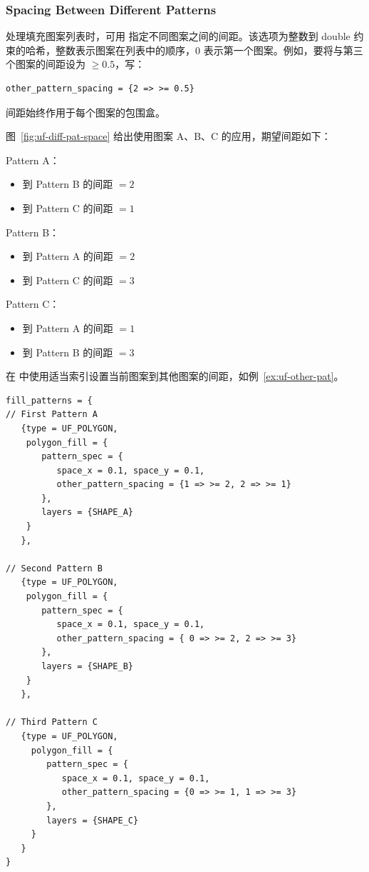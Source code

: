 \subsubsection*{Spacing Between Different Patterns}

处理填充图案列表时，可用  指定不同图案之间的间距。该选项为整数到 double 约束的哈希，整数表示图案在列表中的顺序，0 表示第一个图案。例如，要将与第三个图案的间距设为 $\geq 0.5$，写：
\begin{lstlisting}[style=pxl]
other_pattern_spacing = {2 => >= 0.5}
\end{lstlisting}

\begin{noteBox}
间距始终作用于每个图案的包围盒。
\end{noteBox}

图~\ref{fig:uf-diff-pat-space} 给出使用图案 A、B、C 的应用，期望间距如下：

Pattern A：
\begin{itemize}
  \item 到 Pattern B 的间距 $= 2$
  \item 到 Pattern C 的间距 $= 1$
\end{itemize}
Pattern B：
\begin{itemize}
  \item 到 Pattern A 的间距 $= 2$
  \item 到 Pattern C 的间距 $= 3$
\end{itemize}
Pattern C：
\begin{itemize}
  \item 到 Pattern A 的间距 $= 1$
  \item 到 Pattern B 的间距 $= 3$
\end{itemize}


在  中使用适当索引设置当前图案到其他图案的间距，如例~\ref{ex:uf-other-pat}。

\begin{lstlisting}[style=pxl,caption={使用 other\_pattern\_spacing 选项},label={ex:uf-other-pat}]
fill_patterns = {
// First Pattern A
   {type = UF_POLYGON,
    polygon_fill = {
       pattern_spec = {
          space_x = 0.1, space_y = 0.1,
          other_pattern_spacing = {1 => >= 2, 2 => >= 1}
       },
       layers = {SHAPE_A}
    }
   },

// Second Pattern B
   {type = UF_POLYGON,
    polygon_fill = {
       pattern_spec = {
          space_x = 0.1, space_y = 0.1,
          other_pattern_spacing = { 0 => >= 2, 2 => >= 3}
       },
       layers = {SHAPE_B}
    }
   },

// Third Pattern C
   {type = UF_POLYGON,
     polygon_fill = {
        pattern_spec = {
           space_x = 0.1, space_y = 0.1,
           other_pattern_spacing = {0 => >= 1, 1 => >= 3}
        },
        layers = {SHAPE_C}
     }
   }
}
\end{lstlisting}

